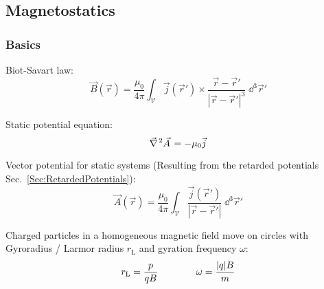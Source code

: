 	\subsection{Magnetostatics}
		\subsubsection{Basics}
			\noindent
			Biot-Savart law:
			\begin{equation}
				\vec{B}(\vec{r}) = \frac{\mu_0}{4\pi}\int_{\mathcal{V}} \vec{j}(\vec{r}')\times\frac{\vec{r}-\vec{r}'}{\left|\vec{r}-\vec{r}'\right|^3}\;\dd^3\vec{r}'
			\end{equation}

			\noindent
			Static potential equation:
			\begin{equation}
				\Nabla^2 \vec{A} = - \mu_0 \vec{j}
			\end{equation}

			\noindent
			Vector potential for static systems (Resulting from the retarded potentials Sec.~\ref{Sec:RetardedPotentials}):
			\begin{equation}
				\vec{A}(\vec{r}) = \frac{\mu_0}{4\pi} \int_{\mathcal{V}} \frac{\vec{j}(\vec{r}')}{\left|\vec{r}-\vec{r}'\right|} \;\dd^3\vec{r}'
			\end{equation}

			\noindent
			Charged particles in a homogeneous magnetic field move on circles with Gyroradius / Larmor radius $r_\text{L}$ and gyration frequency $\omega$:
			\begin{equation}
				\begin{aligned}
					r_\text{L} = \frac{p}{qB} &&\hspace{30pt}
					\omega = \frac{|q| B}{m}
				\end{aligned}
			\end{equation}


